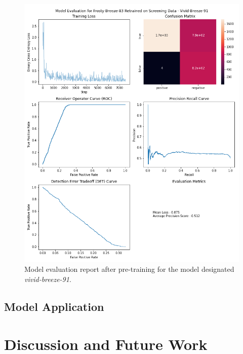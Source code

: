 \documentclass{article}
\begin{document}
\begin{figure}
	\caption{\label{vividbreeze} Model evaluation report after pre-training for the model designated \textit{vivid-breeze-91}. }
	\includegraphics[width = \textwidth]{img/frosty-breeze-83-vivid-breeze-91-eval.png}
\end{figure}
\subsection{Model Application}
\section{Discussion and Future Work}

\printbibliography
\end{document}
